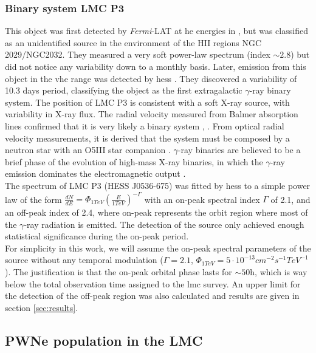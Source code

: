 \documentclass[main.tex]{subfiles}
\begin{document}
\subsubsection{Binary system LMC P3}

This object was first detected by \textit{Fermi}-LAT at \gls{he} energies in \cite{2016LMCFermiLAT}, but was classified as an unidentified source in the environment of the HII regions NGC 2029/NGC2032. They measured a very soft power-law spectrum (index $\sim 2.8$) but did not notice any variability down to a monthly basis.
Later, emission from this object in the \gls{vhe} range was detected by \gls{hess} \cite{2017HESSLMCP3}. They discovered a variability of 10.3 days period, classifying the object as the first extragalactic $\gamma$-ray binary system. The position of LMC P3 is consistent with a soft X-ray source, with variability in X-ray flux. The radial velocity measured from Balmer absorption lines confirmed that it is very likely a binary system \cite{1981softXraysLMC}, \cite{2012xraybinaryP3}. From optical radial velocity measurements, it is derived that the system must be composed by a neutron star with an O5III star companion \cite{2016P3binary}. $\gamma$-ray binaries are believed to be a brief phase of the evolution of high-mass X-ray binaries, in which the $\gamma$-ray emission dominates the electromagnetic output \cite{1989binaries}.\\
The spectrum of LMC P3 (HESS J0536-675) was fitted by \gls{hess} to a simple power law of the form $\frac{dN}{dE} = \Phi_{1TeV}\left( \frac{E}{1TeV}\right)^{-\Gamma}$ with an on-peak spectral index $\Gamma$ of 2.1, and an off-peak index of 2.4, where on-peak represents the orbit region where most of the $\gamma$-ray radiation is emitted. The detection of the source only achieved enough statistical significance during the on-peak period.\\
For simplicity in this work, we will assume the on-peak spectral parameters of the source without any temporal modulation ($\Gamma=2.1$, $\Phi_{1TeV} = 5 \cdot 10^{-13}cm^{-2}s^{-1}TeV^{-1}$). The justification is that the on-peak orbital phase lasts for $\sim 50$h, which is way below the total observation time assigned to the \gls{lmc} survey. An upper limit for the detection of the off-peak region was also calculated and results are given in section \ref{sec:results}.

\subsection{PWNe population in the LMC}\label{sec:pwnepop}
\end{document}
